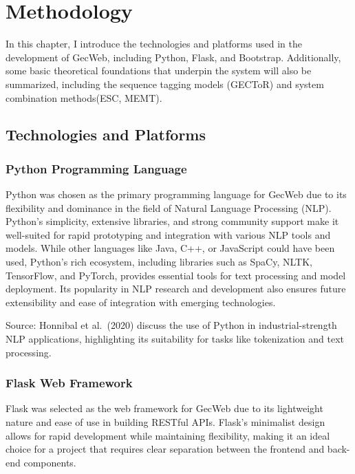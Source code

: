 \chapter{Methodology}
\label{chapter:methodology}

In this chapter, I introduce the technologies and platforms used in the development of GecWeb, including Python, Flask, and Bootstrap.
Additionally, some basic theoretical foundations that underpin the system will also be summarized, including the sequence tagging models (GECToR) and system combination methods(ESC, MEMT).

\section{Technologies and Platforms}
\label{technologies-and-platforms}

\subsection{Python Programming Language}
\label{python-programming-language}

Python was chosen as the primary programming language for GecWeb due to its flexibility and dominance in the field of Natural Language Processing (NLP).
Python's simplicity, extensive libraries, and strong community support make it well-suited for rapid prototyping and integration with various NLP tools and models.
While other languages like Java, C++, or JavaScript could have been used, Python's rich ecosystem, including libraries such as SpaCy, NLTK, TensorFlow, and PyTorch, provides essential tools for text processing and model deployment.
Its popularity in NLP research and development also ensures future extensibility and ease of integration with emerging technologies.

Source: Honnibal et al.~(2020) discuss the use of Python in industrial-strength NLP applications, highlighting its suitability for tasks like tokenization and text processing.

\subsection{Flask Web Framework}
\label{flask-web-framework}

Flask was selected as the web framework for GecWeb due to its lightweight nature and ease of use in building RESTful APIs.
Flask's minimalist design allows for rapid development while maintaining flexibility, making it an ideal choice for a project that requires clear separation between the frontend and back-end components.

